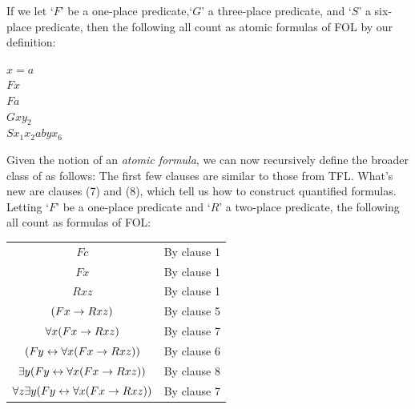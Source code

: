 If we let `$F$' be a one-place predicate,`$G$' a three-place predicate, and `$S$' a six-place predicate, then the following all count as atomic formulas of FOL by our definition:
	\begin{center}
		$x = a$\\
		$Fx$\\
		$Fa$\\
		$Gxy_{2}$\\
		$Sx_1 x_2 a b y x_6$\\
	\end{center}
Given the notion of an \emph{atomic formula}, we can now recursively define the broader class of  as follows:
The first few clauses are similar to those from TFL.  What's new are clauses (7) and (8), which tell us how to construct quantified formulas.  Letting `$F$' be a one-place predicate and `$R$' a two-place predicate, the following all count as formulas of FOL:

\begin{center}
\begin{tabular}{ c c }
$Fc$ 	& By clause 1 \\
$Fx$		& By clause 1\\
$Rxz$ 	& By clause 1\\
$(Fx \rightarrow Rxz)$	& By clause 5\\
$\forall x (Fx \rightarrow Rxz)$ 	& By clause 7\\
$(Fy \leftrightarrow \forall x (Fx \rightarrow Rxz))$ 	& By clause 6 \\
$\exists y (Fy \leftrightarrow \forall x (Fx \rightarrow Rxz))$	& By clause 8\\
$\forall z\exists y (Fy \leftrightarrow \forall x (Fx \rightarrow Rxz))$	& By clause 7\\
\end{tabular}
\end{center}


